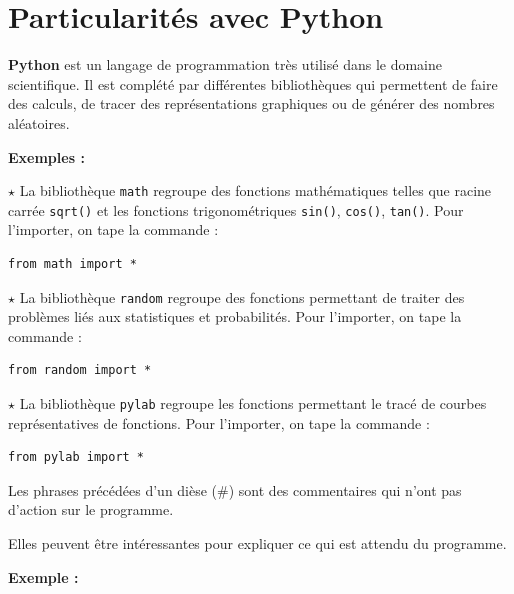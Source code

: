 \section{Particularités avec Python}
\label{sec:particularites}

\begin{CadreAlgo}{\linewidth}{}
\textbf{Python} est un langage de programmation très utilisé dans le domaine scientifique. Il est complété par
différentes bibliothèques qui permettent de faire des calculs, de tracer des représentations graphiques
ou de générer des nombres aléatoires.
\end{CadreAlgo}

\medskip

\textbf{\large Exemples :}

$\star$ La bibliothèque \verb~math~ regroupe des fonctions mathématiques telles que racine carrée \verb~sqrt()~ et les
fonctions trigonométriques \verb~sin()~, \verb~cos()~, \verb~tan()~. 
Pour l'importer, on tape la commande :
\begin{lstlisting}
from math import *
\end{lstlisting}

$\star$ La bibliothèque \verb!random! regroupe des fonctions permettant de traiter des problèmes liés aux statistiques
et probabilités. 
Pour l'importer, on tape la commande :
\begin{lstlisting}
from random import *
\end{lstlisting}


$\star$ La bibliothèque \verb!pylab! regroupe les fonctions permettant le tracé de courbes représentatives de fonctions.
Pour l'importer, on tape la commande :
\begin{lstlisting}
from pylab import *
\end{lstlisting}



\begin{CadreAlgo}{\linewidth}{}
Les phrases précédées d'un dièse (\#) sont
des commentaires qui n'ont pas d'action sur le programme.

Elles peuvent être intéressantes pour expliquer ce qui est attendu du programme.
\end{CadreAlgo}

\medskip

\textbf{\large Exemple :}

\lstset{%
frame=single,%
numbers=left,%
numberstyle=\small,%
firstnumber=0,%
tabsize=6,%
showtabs=false,%
xleftmargin=20pt,%
xrightmargin=5pt,%
framexleftmargin=0pt,%
}

